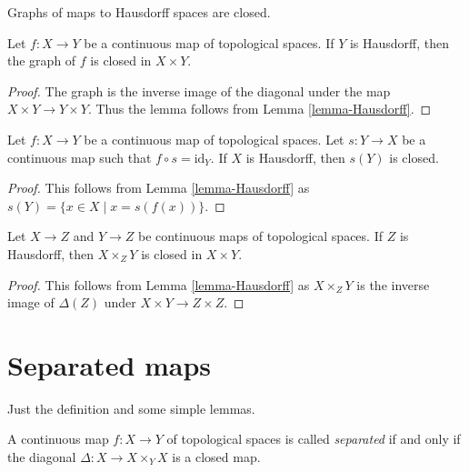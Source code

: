 \begin{lemma}
\label{lemma-graph-closed}
\begin{slogan}
Graphs of maps to Hausdorff spaces are closed.
\end{slogan}
Let $f : X \to Y$ be a continuous map of topological spaces.
If $Y$ is Hausdorff, then the graph of $f$ is closed in $X \times Y$.
\end{lemma}

\begin{proof}
The graph is the inverse image of the diagonal under the map
$X \times Y \to Y \times Y$. Thus the lemma follows from
Lemma \ref{lemma-Hausdorff}.
\end{proof}

\begin{lemma}
\label{lemma-section-closed}
Let $f : X \to Y$ be a continuous map of topological spaces.
Let $s : Y \to X$ be a continuous map such that $f \circ s = \text{id}_Y$.
If $X$ is Hausdorff, then $s(Y)$ is closed.
\end{lemma}

\begin{proof}
This follows from Lemma \ref{lemma-Hausdorff} as
$s(Y) = \{x \in X \mid x = s(f(x))\}$.
\end{proof}

\begin{lemma}
\label{lemma-fibre-product-closed}
Let $X \to Z$ and $Y \to Z$ be continuous maps of topological spaces.
If $Z$ is Hausdorff, then $X \times_Z Y$ is closed in $X \times Y$.
\end{lemma}

\begin{proof}
This follows from Lemma \ref{lemma-Hausdorff} as
$X \times_Z Y$ is the inverse image of $\Delta(Z)$
under $X \times Y \to Z \times Z$.
\end{proof}




\section{Separated maps}
\label{section-separated}

\noindent
Just the definition and some simple lemmas.

\begin{definition}
\label{definition-separated}
A continuous map $f : X \to Y$ of topological spaces is called
{\it separated} if and only if the diagonal $\Delta : X \to X \times_Y X$
is a closed map.
\end{definition}

